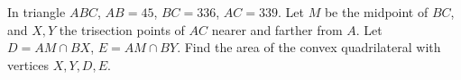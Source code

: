 In triangle $ABC$, $AB=45$, $BC=336$, $AC=339$. Let $M$ be the midpoint of $BC$, and $X,Y$ the trisection points of $AC$ nearer and farther from $A$. Let $D=AM\cap BX$, $E=AM\cap BY$. Find the area of the convex quadrilateral with vertices $X,Y,D,E$.
